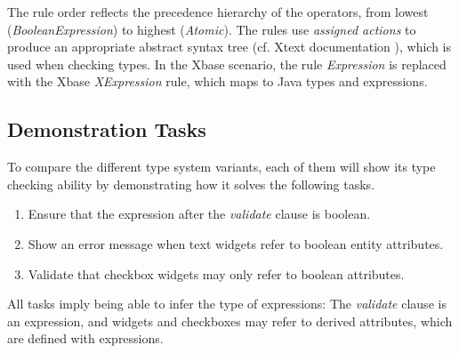 The rule order reflects
the precedence hierarchy of the operators, from lowest
(\emph{BooleanExpression}) to highest (\emph{Atomic}). The rules use
\emph{assigned actions} to produce an appropriate abstract syntax tree (cf.
Xtext documentation \cite{xtextdoc}), which is used when checking types.
In the Xbase scenario, the rule \emph{Expression} is replaced with the Xbase
\emph{XExpression} rule, which maps to Java types and expressions.


\subsection{Demonstration Tasks}
To compare the different type system variants, each of them will show its type
checking ability by demonstrating how it solves the following tasks.
\begin{enumerate}
\item Ensure that the expression after the \emph{validate} clause is boolean.
\item Show an error message when text widgets refer to boolean entity attributes.
\item Validate that checkbox widgets may only refer to boolean attributes.
\end{enumerate}

All tasks imply being able to infer the type of expressions: The \emph{validate}
clause is an expression, and widgets and checkboxes may refer to derived
attributes, which are defined with expressions. 
